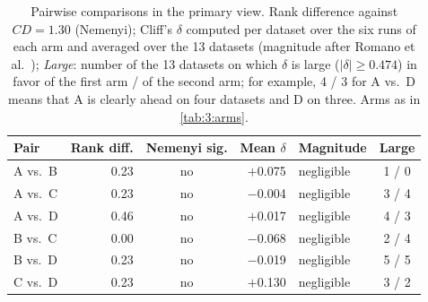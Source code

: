 \begin{table}[htbp]
  \centering
  \small
  \caption[Pairwise comparisons]{Pairwise comparisons in the primary view. Rank difference against $\mathit{CD} = 1.30$ (Nemenyi); Cliff's $\delta$ computed per dataset over the six runs of each arm and averaged over the 13 datasets (magnitude after Romano et al.~\cite{romano2006appropriate}); \emph{Large}: number of the 13 datasets on which $\delta$ is large ($|\delta| \geq 0.474$) in favor of the first arm / of the second arm; for example, 4 / 3 for A vs.\ D means that A is clearly ahead on four datasets and D on three. Arms as in \autoref{tab:3:arms}.}
  \label{tab:6:pairs}
  \begin{tabular}{lrcrlc}
    \toprule
    Pair & Rank diff. & Nemenyi sig. & Mean $\delta$ & Magnitude & Large \\
    \midrule
    A vs.\ B & 0.23 & no & $+$0.075 & negligible & 1 / 0 \\
    A vs.\ C & 0.23 & no & $-$0.004 & negligible & 3 / 4 \\
    A vs.\ D & 0.46 & no & $+$0.017 & negligible & 4 / 3 \\
    B vs.\ C & 0.00 & no & $-$0.068 & negligible & 2 / 4 \\
    B vs.\ D & 0.23 & no & $-$0.019 & negligible & 5 / 5 \\
    C vs.\ D & 0.23 & no & $+$0.130 & negligible & 3 / 2 \\
    \bottomrule
  \end{tabular}
\end{table}
